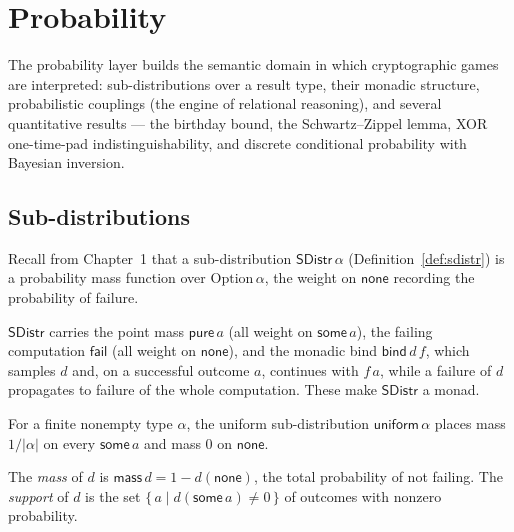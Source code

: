 \chapter{Probability}

The probability layer builds the semantic domain in which cryptographic games
are interpreted: sub-distributions over a result type, their monadic structure,
probabilistic couplings (the engine of relational reasoning), and several
quantitative results --- the birthday bound, the Schwartz--Zippel
lemma, XOR one-time-pad indistinguishability, and discrete conditional
probability with Bayesian inversion.

\section{Sub-distributions}

Recall from Chapter~1 that a sub-distribution $\mathsf{SDistr}\,\alpha$
(Definition~\ref{def:sdistr}) is a probability mass function over
$\mathrm{Option}\,\alpha$, the weight on $\mathsf{none}$ recording the
probability of failure.

\begin{definition}
  \label{def:sdistr-ops}
  \leanok
  $\mathsf{SDistr}$ carries the point mass $\mathsf{pure}\,a$ (all weight on
  $\mathsf{some}\,a$), the failing computation $\mathsf{fail}$ (all weight on
  $\mathsf{none}$), and the monadic bind $\mathsf{bind}\,d\,f$, which samples
  $d$ and, on a successful outcome $a$, continues with $f\,a$, while a failure
  of $d$ propagates to failure of the whole computation. These make
  $\mathsf{SDistr}$ a monad.
\end{definition}

\begin{definition}
  \label{def:sdistr-uniform}
  \leanok
  For a finite nonempty type $\alpha$, the uniform sub-distribution
  $\mathsf{uniform}\,\alpha$ places mass $1/\lvert\alpha\rvert$ on every
  $\mathsf{some}\,a$ and mass $0$ on $\mathsf{none}$.
\end{definition}

\begin{definition}
  \label{def:sdistr-measures}
  \leanok
  The \emph{mass} of $d$ is $\mathsf{mass}\,d = 1 - d(\mathsf{none})$, the total
  probability of not failing. The \emph{support} of $d$ is the set
  $\{\,a \mid d(\mathsf{some}\,a) \neq 0\,\}$ of outcomes with nonzero
  probability.
\end{definition}

